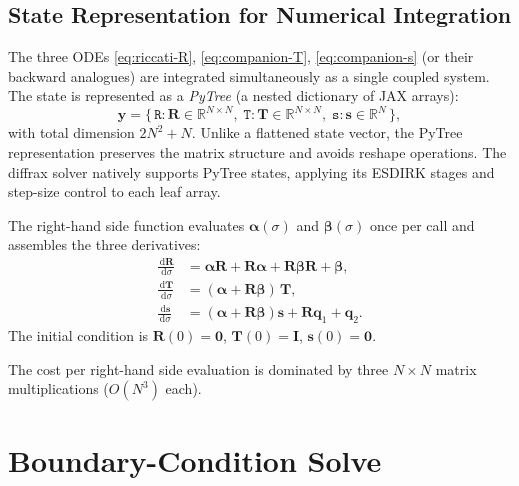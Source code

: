 \documentclass[11pt,a4paper]{article}
\newcommand{\R}{\mathbb{R}}
\newcommand{\vect}[1]{\bm{#1}}
\newcommand{\mat}[1]{\mathbf{#1}}
\newcommand{\dd}{\,\mathrm{d}}
\theoremstyle{definition}
\begin{document}
\subsection{State Representation for Numerical Integration}\label{sec:state}

The three ODEs \eqref{eq:riccati-R}, \eqref{eq:companion-T},
\eqref{eq:companion-s} (or their backward analogues) are integrated
simultaneously as a single coupled system.  The state is represented as
a \emph{PyTree} (a nested dictionary of JAX arrays):
\begin{equation}\label{eq:state-pytree}
  \vect{y} =
  \bigl\{\,
    \texttt{R}: \mat{R} \in \R^{N \times N},\;
    \texttt{T}: \mat{T} \in \R^{N \times N},\;
    \texttt{s}: \vect{s} \in \R^{N}
  \,\bigr\},
\end{equation}
with total dimension $2N^2 + N$.  Unlike a flattened state vector,
the PyTree representation preserves the matrix structure and avoids
reshape operations.  The diffrax solver natively supports PyTree states,
applying its ESDIRK stages and step-size control to each leaf array.

The right-hand side function evaluates $\mat{\alpha}(\sigma)$ and
$\mat{\beta}(\sigma)$ once per call and assembles the three derivatives:
\begin{align}
  \frac{\dd\mat{R}}{\dd\sigma}
  &= \mat{\alpha}\mat{R} + \mat{R}\mat{\alpha}
     + \mat{R}\mat{\beta}\mat{R} + \mat{\beta},
  \label{eq:rhs-R} \\
  \frac{\dd\mat{T}}{\dd\sigma}
  &= (\mat{\alpha} + \mat{R}\mat{\beta})\,\mat{T},
  \label{eq:rhs-T} \\
  \frac{\dd\vect{s}}{\dd\sigma}
  &= (\mat{\alpha} + \mat{R}\mat{\beta})\vect{s}
     + \mat{R}\vect{q}_1 + \vect{q}_2.
  \label{eq:rhs-s}
\end{align}
The initial condition is $\mat{R}(0) = \mat{0}$, $\mat{T}(0) = \mat{I}$,
$\vect{s}(0) = \vect{0}$.

The cost per right-hand side evaluation is dominated by three
$N\!\times\!N$ matrix multiplications ($O(N^3)$ each).

\section{Boundary-Condition Solve}\label{sec:bc}
\end{document}
